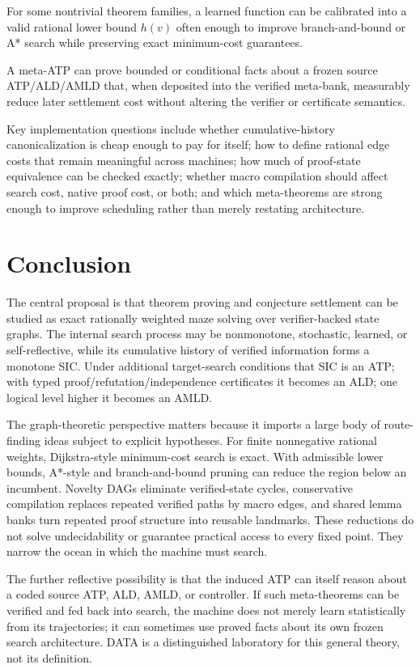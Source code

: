 \begin{conjecture}
For some nontrivial theorem families, a learned function can be calibrated into a valid rational lower bound $h(v)$ often enough to improve branch-and-bound or A* search while preserving exact minimum-cost guarantees.
\end{conjecture}

\begin{conjecture}
A meta-ATP can prove bounded or conditional facts about a frozen source ATP/ALD/AMLD that, when deposited into the verified meta-bank, measurably reduce later settlement cost without altering the verifier or certificate semantics.
\end{conjecture}

Key implementation questions include whether cumulative-history canonicalization is cheap enough to pay for itself; how to define rational edge costs that remain meaningful across machines; how much of proof-state equivalence can be checked exactly; whether macro compilation should affect search cost, native proof cost, or both; and which meta-theorems are strong enough to improve scheduling rather than merely restating architecture.

\section{Conclusion}
The central proposal is that theorem proving and conjecture settlement can be studied as exact rationally weighted maze solving over verifier-backed state graphs. The internal search process may be nonmonotone, stochastic, learned, or self-reflective, while its cumulative history of verified information forms a monotone SIC. Under additional target-search conditions that SIC is an ATP; with typed proof/refutation/independence certificates it becomes an ALD; one logical level higher it becomes an AMLD.

The graph-theoretic perspective matters because it imports a large body of route-finding ideas subject to explicit hypotheses. For finite nonnegative rational weights, Dijkstra-style minimum-cost search is exact. With admissible lower bounds, A*-style and branch-and-bound pruning can reduce the region below an incumbent. Novelty DAGs eliminate verified-state cycles, conservative compilation replaces repeated verified paths by macro edges, and shared lemma banks turn repeated proof structure into reusable landmarks. These reductions do not solve undecidability or guarantee practical access to every fixed point. They narrow the ocean in which the machine must search.

The further reflective possibility is that the induced ATP can itself reason about a coded source ATP, ALD, AMLD, or controller. If such meta-theorems can be verified and fed back into search, the machine does not merely learn statistically from its trajectories; it can sometimes use proved facts about its own frozen search architecture. DATA is a distinguished laboratory for this general theory, not its definition.
